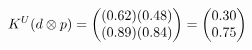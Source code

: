 \documentclass[preview]{standalone}
\begin{document}
\begin{align*}
\special{dvisvgm:raw <g id='unique000'>}K^U(d \otimes p) = \begin{pmatrix} (0.62)(0.48) \\ (0.89)(0.84) \end{pmatrix} = \begin{pmatrix} 0.30 \\ 0.75 \end{pmatrix}\special{dvisvgm:raw </g>}
\end{align*}
\end{document}
